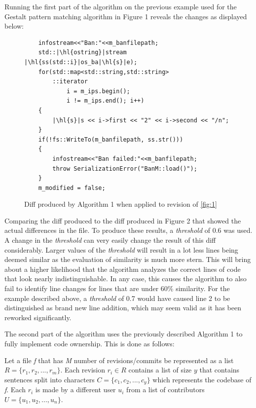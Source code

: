 Running the first part of the algorithm on the previous example used for the Gestalt pattern matching algorithm in Figure 1 reveals the changes as displayed below:
\begin{figure}
    \centering
    \begin{verbatim}
    infostream<<"Ban:"<<m_banfilepath;
    std::|\hl{ostring}|stream |\hl{ss(std::i}|os_ba|\hl{s}|e);
    for(std::map<std::string,std::string>
        ::iterator
            i = m_ips.begin();
            i != m_ips.end(); i++)
    {
        |\hl{s}|s << i->first << "2" << i->second << "/n";
    }
    if(!fs::WriteTo(m_banfilepath, ss.str()))
    {
        infostream<<"Ban failed:"<<m_banfilepath;
        throw SerializationError("BanM::load()");
    }
    m_modified = false;
    \end{verbatim}
    \caption{Diff produced by Algorithm 1 when applied to revision of \ref{fig:1} \citep{ahola_2018}}
    \label{fig:4}
\end{figure}

Comparing the diff produced to the diff produced in Figure 2 that showed the actual differences in the file. To produce these results, a \textit{threshold} of 0.6 was used. A change in the \textit{threshold} can very easily change the result of this diff considerably. Larger values of the \textit{threshold} will result in a lot less lines being deemed similar as the evaluation of similarity is much more stern. This will bring about a higher likelihood that the algorithm analyzes the correct lines of code that look nearly indistinguishable. In any case, this causes the algorithm to also fail to identify line changes for lines that are under 60\% similarity. For the example described above, a \textit{threshold} of 0.7 would have caused line 2 to be distinguished as brand new line addition, which may seem valid as it has been reworked significantly.

The second part of the algorithm uses the previously described Algorithm 1 to fully implement code ownership. This is done as follows:

Let a file \textit{f} that has \textit{M} number of revisions/commits be represented as a list $R = \{ r_1, r_2, ..., r_m \}$. Each revision $r_i \in R$ contains a list of size $y$ that contains sentences split into characters $C = \{c_1, c_2, ..., c_y\}$ which represents the codebase of \textit{f}. Each $r_i$ is made by a different user $u_i$ from a list of contributors $U = \{u_1, u_2, ..., u_n\}$. 

